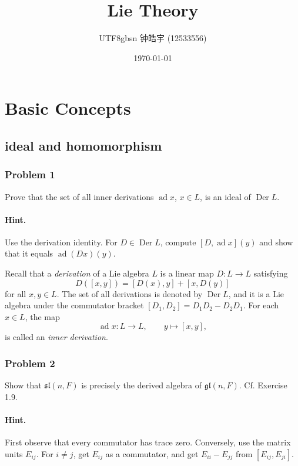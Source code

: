 \documentclass[12pt, a4paper]{article}
\title{Lie Theory}
\author{
    \begin{CJK*}{UTF8}{gbsn}
    钟皓宇 (12533556)
    \end{CJK*}
}
\date{\today}
\begin{document}
\maketitle
\section{Basic Concepts}

\subsection{ideal and homomorphism}

\subsubsection{Problem 1}

Prove that the set of all inner derivations \(\operatorname{ad} x\), \(x \in L\),
is an ideal of \(\operatorname{Der} L\).

\paragraph{Hint.}
Use the derivation identity. For \(D \in \operatorname{Der}L\), compute
\([D,\operatorname{ad}x](y)\) and show that it equals \(\operatorname{ad}(Dx)(y)\).


Recall that a \emph{derivation} of a Lie algebra \(L\) is a linear map
\(D:L\to L\) satisfying
\[
D([x,y])=[D(x),y]+[x,D(y)]
\]
for all \(x,y\in L\). The set of all derivations is denoted by
\(\operatorname{Der}L\), and it is a Lie algebra under the commutator bracket
\([D_1,D_2]=D_1D_2-D_2D_1\). For each \(x\in L\), the map
\[
\operatorname{ad}x:L\to L,\qquad y\mapsto [x,y],
\]
is called an \emph{inner derivation}.
\subsubsection{Problem 2}

Show that \(\mathfrak{sl}(n,F)\) is precisely the derived algebra of
\(\mathfrak{gl}(n,F)\). Cf. Exercise 1.9.

\paragraph{Hint.}
First observe that every commutator has trace zero. Conversely, use the matrix
units \(E_{ij}\). For \(i \neq j\), get \(E_{ij}\) as a commutator, and get
\(E_{ii}-E_{jj}\) from \([E_{ij},E_{ji}]\).
\end{document}
